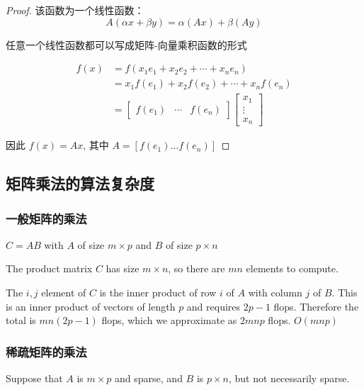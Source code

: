 \begin{proof}
    该函数为一个线性函数： $$ A(\alpha x+\beta y)=\alpha(A x)+\beta(A y) $$ 
    
    任意一个线性函数都可以写成矩阵-向量乘积函数的形式

    $$ \begin{aligned} f(x) &=f\left(x_{1} e_{1}+x_{2} e_{2}+\cdots+x_{n} e_{n}\right) \\ &=x_{1} f\left(e_{1}\right)+x_{2} f\left(e_{2}\right)+\cdots+x_{n} f\left(e_{n}\right) \\ &=\left[\begin{array}{lll}f\left(e_{1}\right) & \cdots & f\left(e_{n}\right)\end{array}\right]\left[\begin{array}{c}x_{1} \\ \vdots \\ x_{n}\end{array}\right] \end{aligned} $$

    因此 $ f(x)=A x $, 其中 $ A=\left[f\left(e_{1}\right) \ldots f\left(e_{n}\right)\right] $
\end{proof}

\subsection{矩阵乘法的算法复杂度}

\subsubsection{一般矩阵的乘法}

$ C=A B $ with $ A $ of size $ m \times p $ and $ B $ of size $ p \times n $

The product matrix $ C $ has size $ m \times n $, so there are $ m n $ elements to compute. 

The $ i, j $ element of $ C $ is the inner product of row $ i $ of $ A $ with column $ j $ of $ B . $ This is an inner product of vectors of length $ p $ and requires $ 2 p-1 $ flops. Therefore the total is $ m n(2 p-1) $ flops, which we approximate as $ 2 m n p $ flops. $O(mnp)$

\subsubsection{稀疏矩阵的乘法}

Suppose that $ A $ is $ m \times p $ and sparse, and $ B $ is $ p \times n $, but not necessarily sparse. 

